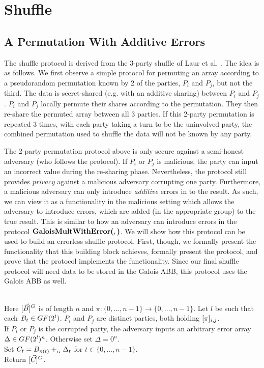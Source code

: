 \section{Shuffle}

\subsection{A Permutation With Additive Errors}

The shuffle protocol is derived from the 3-party shuffle of
Laur et al. \cite{EPRINT:LauWilZha11}.
The idea is as follows. 
We first observe a simple protocol for permuting an array
according to a pseudorandom permutation known by 2 of the parties, 
$P_i$ and $P_j$, but not the third.
The data is secret-shared (e.g. with an additive sharing) 
between $P_i$ and $P_j$.
$P_i$ and $P_j$ locally permute their shares according to the permutation.
They then re-share the permuted array between all 3 parties.
If this 2-party permutation is repeated 3 times,
with each party taking a turn to be the uninvolved party,
the combined permutation used to shuffle the data will 
not be known by any party.

The 2-party permutation protocol above is only secure against 
a semi-honest adversary (who follows the protocol). 
If $P_i$ or $P_j$ is malicious, the party can input an incorrect value 
during the re-sharing phase.
Nevertheless, the protocol still provides \emph{privacy}
against a malicious adversary corrupting one party.
Furthermore, a malicious adversary can only introduce 
\emph{additive} errors in to the result.
As such, we can view it as a functionality in the 
malicious setting which allows the adversary to introduce errors,
which are added (in the appropriate group) to the true result.
This is similar to how an adversary can introduce errors in the protocol
$\textbf{GaloisMultWithError(}, \textbf{)}$.
We will show how this protocol can be used to build an
errorless shuffle protocol.
First, though, we formally present the functionality
that this building block achieves,
formally present the protocol, 
and prove that the protocol implements the functionality.
Since our final shuffle protocol will need data to be stored
in the Galois ABB, this protocol uses the Galois ABB as well.

\begin{functionality}
	\\
		Here $[\vec{B}]^{G}$ is of length $n$ and
			$\pi: \{0,\ldots,n-1\} \rightarrow \{0,\ldots,n-1\}$.
		Let $l$ be such that each $B_t \in GF(2^l)$.
		$P_i$ and $P_j$ are distinct parties, both holding $[\pi]_{i,j}$.\\
		If $P_i$ or $P_j$ is the corrupted party, 
			the adversary inputs an arbitrary error array
			$\Delta \in GF(2^l)^n$. 
		Otherwise set $\Delta = 0^n$.\\
		Set $C_t = B_{\pi(t)} +_{_G} \Delta_t$ for $t \in \{0, \ldots, n-1\}$.\\
		Return $[\vec{C}]^{G}$.
\end{functionality}


